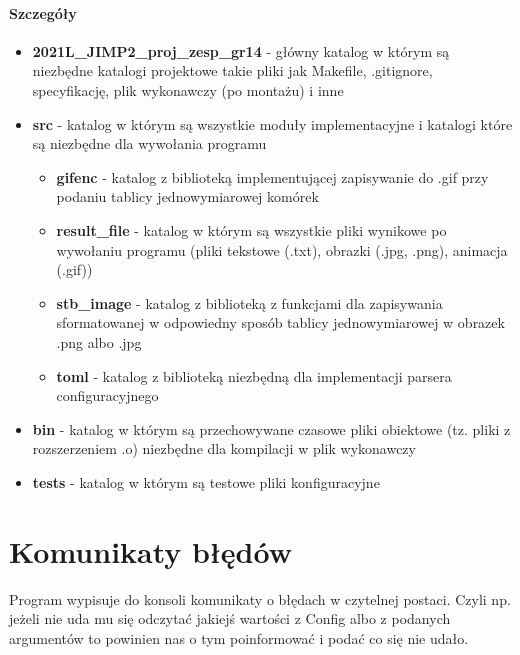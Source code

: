 \documentclass[12pt]{article}
\begin{document}
\paragraph{\large Szczegóły}
\begin{itemize}
    \item 
    \textbf{2021L\_JIMP2\_proj\_zesp\_gr14} - główny katalog w którym są niezbędne katalogi projektowe takie pliki jak Makefile, .gitignore, specyfikację, plik wykonawczy (po montażu) i inne

    \item
    \textbf{src} - katalog w którym są wszystkie moduły implementacyjne i katalogi które są niezbędne dla wywołania programu
    
    \begin{itemize}
        \item 
        \textbf{gifenc} - katalog z biblioteką implementującej zapisywanie do .gif przy podaniu tablicy jednowymiarowej komórek
        
        \item
        \textbf{result\_file} - katalog w którym są wszystkie pliki wynikowe po wywołaniu programu (pliki tekstowe (.txt), obrazki (.jpg, .png), animacja (.gif))
        
        \item
        \textbf{stb\_image} - katalog z biblioteką z funkcjami dla zapisywania sformatowanej w odpowiedny sposób tablicy jednowymiarowej w obrazek .png albo .jpg
        
        \item
        \textbf{toml} - katalog z biblioteką niezbędną dla implementacji parsera configuracyjnego 
    \end{itemize}
    
    \item
    \textbf{bin} - katalog w którym są przechowywane czasowe pliki obiektowe (tz. pliki z rozszerzeniem .o) niezbędne dla kompilacji w plik wykonawczy
    
    \item
    \textbf{tests} - katalog w którym są testowe pliki konfiguracyjne
    
\end{itemize}
\section{Komunikaty błędów}

Program wypisuje do konsoli komunikaty o błędach w czytelnej postaci.
Czyli np. jeżeli nie uda mu się odczytać jakiejś wartości z Config albo z podanych argumentów to powinien nas o tym poinformować i podać co się nie udało.
\end{document}
